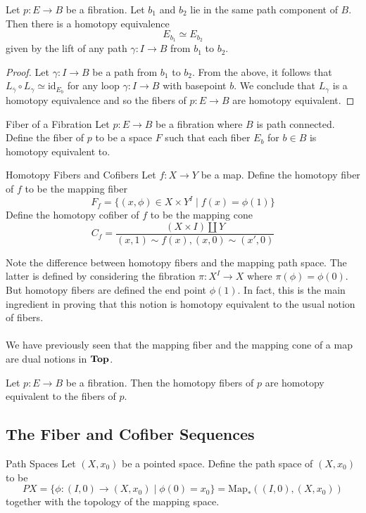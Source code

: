 \documentclass[a4paper]{article}
\begin{document}
\begin{thm}{}{} Let $p:E\to B$ be a fibration. Let $b_1$ and $b_2$ lie in the same path component of $B$. Then there is a homotopy equivalence $$E_{b_1}\simeq E_{b_2}$$ given by the lift of any path $\gamma:I\to B$ from $b_1$ to $b_2$. \tcbline
\begin{proof}
Let $\gamma:I\to B$ be a path from $b_1$ to $b_2$. From the above, it follows that $L_{\overline{\gamma}}\circ L_\gamma\simeq\text{id}_{E_b}$ for any loop $\gamma:I\to B$ with basepoint $b$. We conclude that $L_\gamma$ is a homotopy equivalence and so the fibers of $p:E\to B$ are homotopy equivalent. 
\end{proof}
\end{thm}

\begin{defn}{Fiber of a Fibration}{} Let $p:E\to B$ be a fibration where $B$ is path connected. Define the fiber of $p$ to be a space $F$ such that each fiber $E_b$ for $b\in B$ is homotopy equivalent to. 
\end{defn}

\begin{defn}{Homotopy Fibers and Cofibers}{} Let $f:X\to Y$ be a map. Define the homotopy fiber of $f$ to be the mapping fiber $$F_f=\{(x,\phi)\in X\times Y^I\;|\;f(x)=\phi(1)\}$$ Define the homotopy cofiber of $f$ to be the mapping cone $$C_f=\frac{(X\times I)\amalg Y}{(x,1)\sim f(x),(x,0)\sim(x',0)}$$
\end{defn}

Note the difference between homotopy fibers and the mapping path space. The latter is defined by considering the fibration $\pi:X^I\to X$ where $\pi(\phi)=\phi(0)$. But homotopy fibers are defined the end point $\phi(1)$. In fact, this is the main ingredient in proving that this notion is homotopy equivalent to the usual notion of fibers. \\~\\

We have previously seen that the mapping fiber and the mapping cone of a map are dual notions in $\bold{Top}$. 

\begin{prp}{}{} Let $p:E\to B$ be a fibration. Then the homotopy fibers of $p$ are homotopy equivalent to the fibers of $p$. 
\end{prp}

\subsection{The Fiber and Cofiber Sequences}
\begin{defn}{Path Spaces}{} Let $(X,x_0)$ be a pointed space. Define the path space of $(X,x_0)$ to be $$PX=\{\phi:(I,0)\to(X,x_0)\;|\;\phi(0)=x_0\}=\text{Map}_\ast((I,0),(X,x_0))$$ together with the topology of the mapping space. 
\end{defn}
\end{document}
